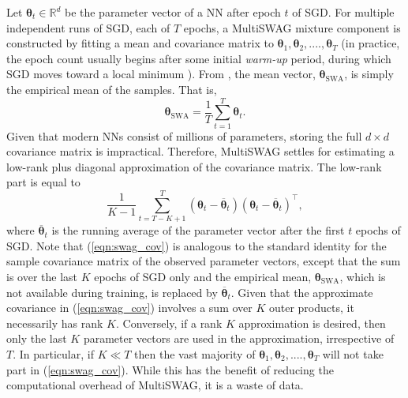 \documentclass[a4paper,11pt]{article}
\newcommand{\bgreek}[1]{\boldsymbol{#1}}
\newcommand{\R}{\mathbb R}
\begin{document}
Let $\bgreek{\theta}_t \in \R^d$ be the parameter vector of a NN after epoch $t$ of SGD. For multiple independent runs of SGD, each of $T$ epochs, a MultiSWAG mixture component is constructed by fitting a mean and covariance matrix to $\bgreek{\theta}_1, \bgreek{\theta}_2, ...., \bgreek{\theta}_T$ (in practice, the epoch count usually begins after some initial \emph{warm-up} period, during which SGD moves toward a local minimum \cite{mandt2017}). From \cite{maddox2019}, the mean vector, $\bgreek{\theta}_{\text{SWA}}$, is simply the empirical mean of the samples. That is,  
\begin{equation}\label{eqn:swa_solution}
	\bgreek{\theta}_{\text{SWA}} = \frac{1}{T}\sum_{t=1}^T \bgreek{\theta}_t.
\end{equation}
Given that modern NNs consist of millions of parameters, storing the full $d \times d$ covariance matrix is impractical. Therefore, MultiSWAG settles for estimating a low-rank plus diagonal approximation of the covariance matrix. The low-rank part is equal to 
\begin{equation}\label{eqn:swag_cov}
	\frac{1}{K-1} \sum_{t=T-K+1}^T (\bgreek{\theta}_t - \overline{\bgreek{\theta}}_t) (\bgreek{\theta}_t - \overline{\bgreek{\theta}}_t)^\intercal,
\end{equation}
where $\overline{\bgreek{\theta}}_t$ is the running average of the parameter vector after the first $t$ epochs of SGD. Note that (\ref{eqn:swag_cov}) is analogous to the standard identity for the sample covariance matrix of the observed parameter vectors, except that the sum is over the last $K$ epochs of SGD only and the empirical mean, $\bgreek{\theta}_{\text{SWA}}$, which is not available during training, is replaced by $\overline{\bgreek{\theta}}_t$.
Given that the approximate covariance in (\ref{eqn:swag_cov}) involves a sum over $K$ outer products, it necessarily has rank $K$. Conversely, if a rank $K$ approximation is desired, then only the last $K$ parameter vectors are used in the approximation, irrespective of $T$. In particular, if $K \ll T$ then the vast majority of $\bgreek{\theta}_1, \bgreek{\theta}_2, ...., \bgreek{\theta}_T$ will not take part in (\ref{eqn:swag_cov}). While this has the benefit of reducing the computational overhead of MultiSWAG, it is a waste of data. 
\end{document}
